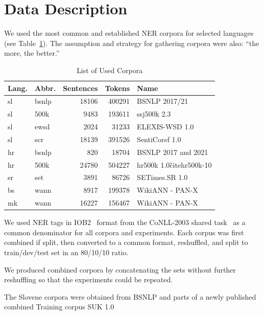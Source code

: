 \documentclass[sigconf]{acmart}
\begin{document}
\section{Data Description}
\label{sec:data-description}
We used the most common and established NER corpora for selected languages (see Table~\ref{tab:corpora}).
The assumption and strategy for gathering corpora were also: ``the more, the better.''
\begin{table}[H]
  \caption{List of Used Corpora}
  \label{tab:corpora}
  \begin{tabular}{llrrl}
    \toprule
    Lang.&Abbr.&Sentences&Tokens&Name\\
    \midrule
    sl&bsnlp&18106&400291&BSNLP 2017/21~\cite{piskorski-etal-2021-slav}\\
    sl&500k&9483&193611&ssj500k 2.3~\cite{ssj500k-23}\\
    sl&ewsd&2024&31233&{ELEXIS}-{WSD} 1.0~\cite{ELEXIS-WSD-10}\\
    sl&scr&18139&391526&{SentiCoref} 1.0~\cite{SentiCoref-10}\\
    \midrule
    hr&bsnlp&820&18704&BSNLP 2017 and 2021~\cite{piskorski-etal-2021-slav}\\
    hr&500k&24780&504227&hr500k 1.0\~cite{hr500k-10}\\
    \midrule
    sr&set&3891&86726&{SETimes}.{SR} 1.0~\cite{SETimes-SR-1.0}\\
    \midrule
    bs&wann&8917&199378&WikiANN - PAN-X~\cite{rahimi-etal-2019-massively}\\
    \midrule
    mk&wann&16227&156467&WikiANN - PAN-X~\cite{rahimi-etal-2019-massively}\\
  \bottomrule
  \end{tabular}
\end{table}
We used NER tags in IOB2~\cite{IOB2} format from the CoNLL-2003 shared task~\cite{CoNLL2003} as a common denominator for all corpora and experiments.
Each corpus was first combined if split, then converted to a common format, reshuffled, and split to train/dev/test set in an 80/10/10 ratio.

We produced combined corpora by concatenating the sets without further reshuffling so that the experiments could be repeated.

The Slovene corpora were obtained from BSNLP and parts of a newly published combined Training corpus {SUK} 1.0~\cite{SUK-1.0}
\end{document}
